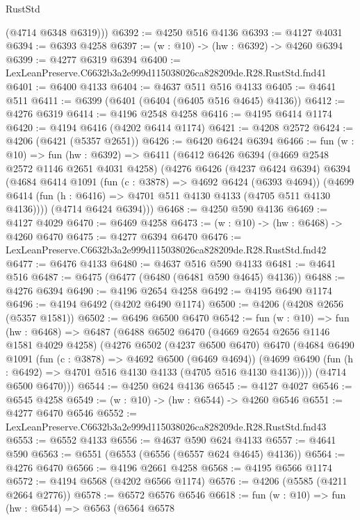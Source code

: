 \begin{lexlean}{RustStd}
\begin{coremodule}
        (@4714 @6348 @6319)))
@6392 := @4250 @516 @4136
@6393 := @4127 @4031
@6394 := @6393 @4258
@6397 := (w : @10) -> (hw : @6392) -> @4260 @6394
@6399 := @4277 @6319 @6394
@6400 := LexLeanPreserve.C6632b3a2e999d115038026ca828209de.R28.RustStd.fnd41
@6401 := @6400 @4133
@6404 := @4637 @511 @516 @4133
@6405 := @4641 @511
@6411 := @6399 (@6401 (@6404 (@6405 @516 @4645) @4136))
@6412 := @4276 @6319
@6414 := @4196 @2548 @4258
@6416 := @4195 @6414 @1174
@6420 := @4194 @6416 (@4202 @6414 @1174)
@6421 := @4208 @2572
@6424 := @4206 (@6421 (@5357 @2651))
@6426 := @6420 @6424 @6394
@6466 := fun (w : @10) =>
  fun (hw : @6392) =>
  @6411
    (@6412
      @6426
      @6394
      (@4669 @2548 @2572 @1146 @2651 @4031 @4258)
      (@4276
        @6426
        (@4237 @6424 @6394)
        @6394
        (@4684
          @6414
          @1091
          (fun (c : @3878) => @4692 @6424 (@6393 @4694))
          (@4699 @6414 (fun (h : @6416) => @4701 @511 @4130 @4133 (@4705 @511 @4130 @4136))))
        (@4714 @6424 @6394)))
@6468 := @4250 @590 @4136
@6469 := @4127 @4029
@6470 := @6469 @4258
@6473 := (w : @10) -> (hw : @6468) -> @4260 @6470
@6475 := @4277 @6394 @6470
@6476 := LexLeanPreserve.C6632b3a2e999d115038026ca828209de.R28.RustStd.fnd42
@6477 := @6476 @4133
@6480 := @4637 @516 @590 @4133
@6481 := @4641 @516
@6487 := @6475 (@6477 (@6480 (@6481 @590 @4645) @4136))
@6488 := @4276 @6394
@6490 := @4196 @2654 @4258
@6492 := @4195 @6490 @1174
@6496 := @4194 @6492 (@4202 @6490 @1174)
@6500 := @4206 (@4208 @2656 (@5357 @1581))
@6502 := @6496 @6500 @6470
@6542 := fun (w : @10) =>
  fun (hw : @6468) =>
  @6487
    (@6488
      @6502
      @6470
      (@4669 @2654 @2656 @1146 @1581 @4029 @4258)
      (@4276
        @6502
        (@4237 @6500 @6470)
        @6470
        (@4684
          @6490
          @1091
          (fun (c : @3878) => @4692 @6500 (@6469 @4694))
          (@4699 @6490 (fun (h : @6492) => @4701 @516 @4130 @4133 (@4705 @516 @4130 @4136))))
        (@4714 @6500 @6470)))
@6544 := @4250 @624 @4136
@6545 := @4127 @4027
@6546 := @6545 @4258
@6549 := (w : @10) -> (hw : @6544) -> @4260 @6546
@6551 := @4277 @6470 @6546
@6552 := LexLeanPreserve.C6632b3a2e999d115038026ca828209de.R28.RustStd.fnd43
@6553 := @6552 @4133
@6556 := @4637 @590 @624 @4133
@6557 := @4641 @590
@6563 := @6551 (@6553 (@6556 (@6557 @624 @4645) @4136))
@6564 := @4276 @6470
@6566 := @4196 @2661 @4258
@6568 := @4195 @6566 @1174
@6572 := @4194 @6568 (@4202 @6566 @1174)
@6576 := @4206 (@5585 (@4211 @2664 @2776))
@6578 := @6572 @6576 @6546
@6618 := fun (w : @10) =>
  fun (hw : @6544) =>
  @6563
    (@6564
      @6578

\end{coremodule}
\end{lexlean}
